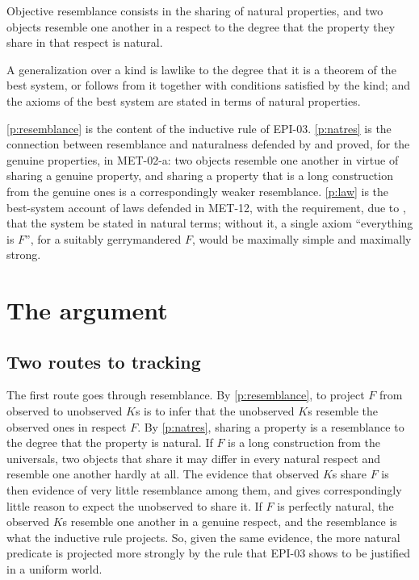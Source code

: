 \documentclass{situationist-preprint}
\begin{document}
\begin{principle}\label{p:natres}
Objective resemblance consists in the sharing of natural properties, and two objects resemble one another in a respect to the degree that the property they share in that respect is natural.
\end{principle}

\begin{principle}[Lawlikeness]\label{p:law}
A generalization over a kind is lawlike to the degree that it is a theorem of the best system, or follows from it together with conditions satisfied by the kind; and the axioms of the best system are stated in terms of natural properties.
\end{principle}

\ref{p:resemblance} is the content of the inductive rule of EPI-03. \ref{p:natres} is the connection between resemblance and naturalness defended by \citet{Lewis1983} and proved, for the genuine properties, in MET-02-a: two objects resemble one another in virtue of sharing a genuine property, and sharing a property that is a long construction from the genuine ones is a correspondingly weaker resemblance. \ref{p:law} is the best-system account of laws defended in MET-12, with the requirement, due to \citet{Lewis1983}, that the system be stated in natural terms; without it, a single axiom \enquote{everything is $F$}, for a suitably gerrymandered $F$, would be maximally simple and maximally strong.

\section{The argument}

\subsection{Two routes to tracking}

The first route goes through resemblance. By \ref{p:resemblance}, to project $F$ from observed to unobserved $K$s is to infer that the unobserved $K$s resemble the observed ones in respect $F$. By \ref{p:natres}, sharing a property is a resemblance to the degree that the property is natural. If $F$ is a long construction from the universals, two objects that share it may differ in every natural respect and resemble one another hardly at all. The evidence that observed $K$s share $F$ is then evidence of very little resemblance among them, and gives correspondingly little reason to expect the unobserved to share it. If $F$ is perfectly natural, the observed $K$s resemble one another in a genuine respect, and the resemblance is what the inductive rule projects. So, given the same evidence, the more natural predicate is projected more strongly by the rule that EPI-03 shows to be justified in a uniform world.
\end{document}
